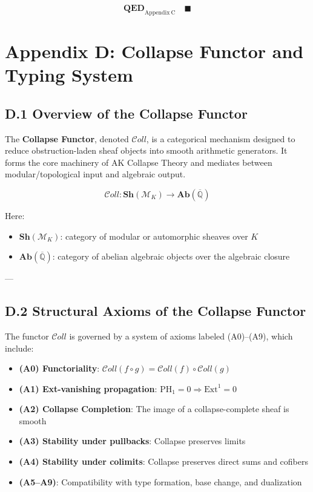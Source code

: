 \documentclass[11pt]{article}
\begin{document}
\[
\textbf{QED}_{\mathrm{Appendix\ C}} \quad \blacksquare
\]



\appendix
\section*{Appendix D: Collapse Functor and Typing System}

\subsection*{D.1 Overview of the Collapse Functor}

The \textbf{Collapse Functor}, denoted \( \mathcal{C}oll \), is a categorical mechanism designed to reduce obstruction-laden sheaf objects into smooth arithmetic generators.  
It forms the core machinery of AK Collapse Theory and mediates between modular/topological input and algebraic output.

\[
\mathcal{C}oll: \mathbf{Sh}(\mathcal{M}_K) \to \mathbf{Ab}(\overline{\mathbb{Q}})
\]

Here:
\begin{itemize}
    \item \( \mathbf{Sh}(\mathcal{M}_K) \): category of modular or automorphic sheaves over \( K \)
    \item \( \mathbf{Ab}(\overline{\mathbb{Q}}) \): category of abelian algebraic objects over the algebraic closure
\end{itemize}

---

\subsection*{D.2 Structural Axioms of the Collapse Functor}

The functor \( \mathcal{C}oll \) is governed by a system of axioms labeled (A0)–(A9), which include:

\begin{itemize}
    \item \textbf{(A0) Functoriality}: \( \mathcal{C}oll(f \circ g) = \mathcal{C}oll(f) \circ \mathcal{C}oll(g) \)
    \item \textbf{(A1) Ext-vanishing propagation}: \( \mathrm{PH}_1 = 0 \Rightarrow \mathrm{Ext}^1 = 0 \)
    \item \textbf{(A2) Collapse Completion}: The image of a collapse-complete sheaf is smooth
    \item \textbf{(A3) Stability under pullbacks}: Collapse preserves limits
    \item \textbf{(A4) Stability under colimits}: Collapse preserves direct sums and cofibers
    \item \textbf{(A5–A9)}: Compatibility with type formation, base change, and dualization
\end{itemize}
\end{document}
